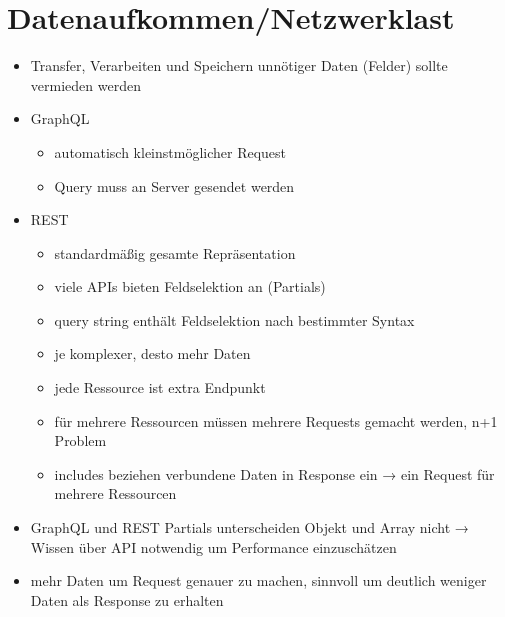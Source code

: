 \section{Datenaufkommen/Netzwerklast}
\begin{itemize}
  \item Transfer, Verarbeiten und Speichern unnötiger Daten (Felder) sollte vermieden werden
  \item GraphQL
  \begin{itemize}
    \item automatisch kleinstmöglicher Request
    \item Query muss an Server gesendet werden
  \end{itemize}
  \item REST
  \begin{itemize}
    \item standardmäßig gesamte Repräsentation
    \item viele APIs bieten Feldselektion an (Partials)
    \item query string enthält Feldselektion nach bestimmter Syntax
    \item je komplexer, desto mehr Daten
    \item jede Ressource ist extra Endpunkt
    \item für mehrere Ressourcen müssen mehrere Requests gemacht werden, n+1 Problem
    \item includes beziehen verbundene Daten in Response ein → ein Request für mehrere Ressourcen
  \end{itemize}
  \item GraphQL und REST Partials unterscheiden Objekt und Array nicht → Wissen über API notwendig um Performance einzuschätzen
  \item mehr Daten um Request genauer zu machen, sinnvoll um deutlich weniger Daten als Response zu erhalten
\end{itemize}

